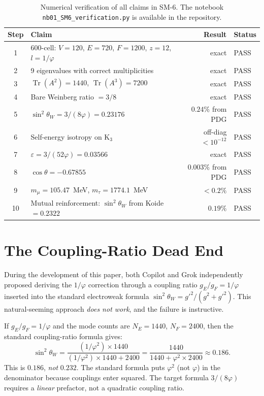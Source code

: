 \documentclass[11pt,letterpaper]{article}
\newcommand{\phig}{\varphi}
\newcommand{\Tr}{\operatorname{Tr}}
\begin{document}
\begin{table}[H]
\centering
\caption{Numerical verification of all claims in SM-6. The notebook
  \texttt{nb01\_SM6\_verification.py} is available in the repository.}
\label{tab:verification}
\begin{tabular}{@{}clrl@{}}
\toprule
Step & Claim & Result & Status \\
\midrule
1 & 600-cell: $V{=}120$, $E{=}720$, $F{=}1200$, $z{=}12$, $l{=}1/\phig$ & exact & PASS \\
2 & 9 eigenvalues with correct multiplicities & exact & PASS \\
3 & $\Tr(A^2) = 1440$, $\Tr(A^3) = 7200$ & exact & PASS \\
4 & Bare Weinberg ratio $= 3/8$ & exact & PASS \\
5 & $\sin^2\theta_W = 3/(8\phig) = 0.23176$ & $0.24\%$ from PDG & PASS \\
6 & Self-energy isotropy on K$_3$ & off-diag $< 10^{-12}$ & PASS \\
7 & $\varepsilon = 3/(52\phig) = 0.03566$ & exact & PASS \\
8 & $\cos\theta = -0.67855$ & $0.003\%$ from PDG & PASS \\
9 & $m_\mu = 105.47$~MeV, $m_\tau = 1774.1$~MeV & $< 0.2\%$ & PASS \\
10 & Mutual reinforcement: $\sin^2\theta_W$ from Koide $= 0.2322$ & $0.19\%$ & PASS \\
\bottomrule
\end{tabular}
\end{table}

\section{The Coupling-Ratio Dead End}
\label{app:deadend}

During the development of this paper, both Copilot and Grok independently proposed deriving the $1/\phig$ correction through a coupling ratio $g_E/g_F = 1/\phig$ inserted into the standard electroweak formula $\sin^2\theta_W = g'^2/(g^2 + g'^2)$. This natural-seeming approach \emph{does not work}, and the failure is instructive.

If $g_E/g_F = 1/\phig$ and the mode counts are $N_E = 1440$, $N_F = 2400$, then the standard coupling-ratio formula gives:
\begin{equation}
\sin^2\theta_W = \frac{(1/\phig^2) \times 1440}{(1/\phig^2) \times 1440 + 2400}
= \frac{1440}{1440 + \phig^2 \times 2400} \approx 0.186.
\label{eq:deadend}
\end{equation}
This is $0.186$, \emph{not} $0.232$. The standard formula puts $\phig^2$ (not $\phig$) in the denominator because couplings enter squared. The target formula $3/(8\phig)$ requires a \emph{linear} prefactor, not a quadratic coupling ratio.
\end{document}
